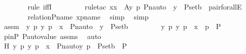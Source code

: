 \begin{isabellebody}
\ \ \ \ \ \ \isamarkupfalse%
\ {\isacharparenleft}{\kern0pt}rule\ iffI{\isacharparenright}{\kern0pt}\ \isanewline
\ \ \ \ \ \ \isamarkupfalse%
\ {\isacharparenleft}{\kern0pt}rule{\isacharunderscore}{\kern0pt}tac\ x{\isacharequal}{\kern0pt}x\ \ A{\isacharequal}{\kern0pt}{\isachardoublequoteopen}{\isasymlambda}y\ p{\isachardot}{\kern0pt}\ Pn{\isacharunderscore}{\kern0pt}auto{\isacharparenleft}{\kern0pt}{\isasympi}{\isacharparenright}{\kern0pt}\ {\isacharbackquote}{\kern0pt}\ y\ {\isasymin}\ P{\isacharunderscore}{\kern0pt}set{\isacharparenleft}{\kern0pt}b{\isacharparenright}{\kern0pt}{\isachardoublequoteclose}\ \ pair{\isacharunderscore}{\kern0pt}forallE{\isacharparenright}{\kern0pt}\ \isanewline
\ \ \ \ \ \ \isamarkupfalse%
\ relation{\isacharunderscore}{\kern0pt}P{\isacharunderscore}{\kern0pt}name\ xpname\ \isamarkupfalse%
\ simp\ \isamarkupfalse%
\ simp\ \isanewline
\ \ \ \ \isamarkupfalse%
\ {\isacharminus}{\kern0pt}\ \isanewline
\ \ \ \ \ \ \isamarkupfalse%
\ assm\ {\isacharcolon}{\kern0pt}\ {\isachardoublequoteopen}{\isacharparenleft}{\kern0pt}{\isasymAnd}y\ p{\isachardot}{\kern0pt}\ {\isasymlangle}y{\isacharcomma}{\kern0pt}\ p{\isasymrangle}\ {\isasymin}\ x\ {\isasymLongrightarrow}\ Pn{\isacharunderscore}{\kern0pt}auto{\isacharparenleft}{\kern0pt}{\isasympi}{\isacharparenright}{\kern0pt}\ {\isacharbackquote}{\kern0pt}\ y\ {\isasymin}\ P{\isacharunderscore}{\kern0pt}set{\isacharparenleft}{\kern0pt}b{\isacharparenright}{\kern0pt}{\isacharparenright}{\kern0pt}{\isachardoublequoteclose}\ \isanewline
\ \ \ \ \ \ \isamarkupfalse%
\ {\isachardoublequoteopen}{\isasymAnd}y\ p{\isachardot}{\kern0pt}\ {\isasymlangle}y{\isacharcomma}{\kern0pt}\ p{\isasymrangle}\ {\isasymin}\ x\ {\isasymLongrightarrow}\ {\isasympi}{\isacharbackquote}{\kern0pt}p\ {\isasymin}\ P{\isachardoublequoteclose}\ \isanewline
\ \ \ \ \ \ \ \ \isamarkupfalse%
\ pinP\ P{\isacharunderscore}{\kern0pt}auto{\isacharunderscore}{\kern0pt}value\ assms\ \isamarkupfalse%
\ auto\ \isanewline
\ \ \ \ \ \ \isamarkupfalse%
\ \isamarkupfalse%
\ H{\isacharcolon}{\kern0pt}\ {\isachardoublequoteopen}{\isasymAnd}y\ p{\isachardot}{\kern0pt}\ {\isasymlangle}y{\isacharcomma}{\kern0pt}\ p{\isasymrangle}\ {\isasymin}\ x\ {\isasymLongrightarrow}\ {\isacharless}{\kern0pt}Pn{\isacharunderscore}{\kern0pt}auto{\isacharparenleft}{\kern0pt}{\isasympi}{\isacharparenright}{\kern0pt}{\isacharbackquote}{\kern0pt}y{\isacharcomma}{\kern0pt}\ {\isasympi}{\isacharbackquote}{\kern0pt}p{\isachargreater}{\kern0pt}\ {\isasymin}\ P{\isacharunderscore}{\kern0pt}set{\isacharparenleft}{\kern0pt}b{\isacharparenright}{\kern0pt}\ {\isasymtimes}\ P{\isachardoublequoteclose}\ \isamarkupfalse%

\end{isabellebody}
